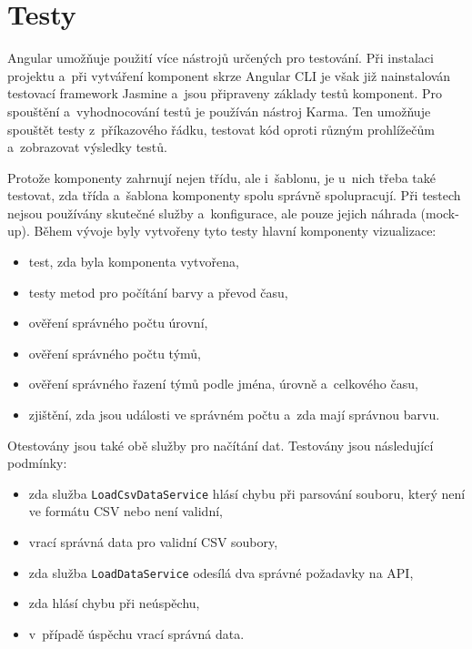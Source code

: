 \documentclass[
  digital, %
  oneside, %
  table,   %
  nolof,     %
  nolot,     %
  nocover
]{fithesis3}
\begin{document}
\section{Testy}
Angular umožňuje použití více nástrojů určených pro testování. Při instalaci projektu a~při vytváření komponent skrze Angular CLI je však již nainstalován testovací framework Jasmine a~jsou připraveny základy testů komponent. Pro spouštění a~vyhodnocování testů je používán nástroj Karma. Ten umožňuje spouštět testy z~příkazového řádku, testovat kód oproti různým prohlížečům a~zobrazovat výsledky testů.\par
Protože komponenty zahrnují nejen třídu, ale i~šablonu, je u~nich třeba také testovat, zda třída a~šablona komponenty spolu správně spolupracují. Při testech nejsou používány skutečné služby a~konfigurace, ale pouze jejich náhrada (mock-up). Během vývoje byly vytvořeny tyto testy hlavní komponenty vizualizace:
\begin{itemize}
  \item test, zda byla komponenta vytvořena,
  \item testy metod pro počítání barvy a převod času,
  \item ověření správného počtu úrovní,
  \item ověření správného počtu týmů,
  \item ověření správného řazení týmů podle jména, úrovně a~celkového času,
  \item zjištění, zda jsou události ve správném počtu a~zda mají správnou barvu.
\end{itemize}
Otestovány jsou také obě služby pro načítání dat. Testovány jsou následující podmínky:
\begin{itemize}
  \item zda služba \verb|LoadCsvDataService| hlásí chybu při parsování souboru, který není ve formátu CSV nebo není validní,
  \item vrací správná data pro validní CSV soubory,
  \item zda služba \verb|LoadDataService| odesílá dva správné požadavky na API,
  \item zda hlásí chybu při neúspěchu,
  \item v~případě úspěchu vrací správná data.
\end{itemize}
\end{document}
